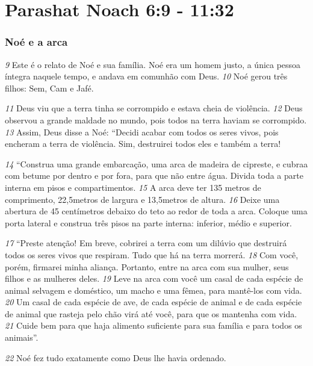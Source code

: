 \section*{Parashat Noach 6:9 - 11:32}
\subsubsection*{Noé e a arca}
\textit{\tiny 9}
 Este é o relato de Noé e sua família. Noé era um homem justo, a única pessoa íntegra naquele tempo, e andava em comunhão com Deus. 
\textit{\tiny 10}
Noé gerou três filhos: Sem, Cam e Jafé.



\bigskip
\textit{\tiny 11}
 Deus viu que a terra tinha se corrompido e estava cheia de violência. 
\textit{\tiny 12}
 Deus observou a grande maldade no mundo, pois todos na terra haviam se corrompido. 
\textit{\tiny 13}
 Assim, Deus disse a Noé: “Decidi acabar com todos os seres vivos, pois encheram a terra de violência. Sim, destruirei todos eles e também a terra!



\bigskip
\textit{\tiny 14}
 “Construa uma grande embarcação, uma arca de madeira de cipreste, e cubraa com betume por dentro e por fora, para que não entre água. Divida toda a parte interna em pisos e compartimentos. 
\textit{\tiny 15}
 A arca deve ter 135 metros de comprimento, 
22,5metros de largura e 
13,5metros de altura. 
\textit{\tiny 16}
 Deixe uma abertura de 45 centímetros debaixo do teto ao redor de toda a arca. Coloque uma porta lateral e construa três pisos na parte interna: inferior, médio e superior.



\bigskip
\textit{\tiny 17}
 “Preste atenção! Em breve, cobrirei a terra com um dilúvio que destruirá todos os seres vivos que respiram. Tudo que há na terra morrerá. 
\textit{\tiny 18}
 Com você, porém, firmarei minha aliança. Portanto, entre na arca com sua mulher, seus filhos e as mulheres deles. 
\textit{\tiny 19}
 Leve na arca com você um casal de cada espécie de animal selvagem e doméstico, um macho e uma fêmea, para mantê-los com vida. 
\textit{\tiny 20}
 Um casal de cada espécie de ave, de cada espécie de animal e de cada espécie de animal que rasteja pelo chão virá até você, para que os mantenha com vida. 
\textit{\tiny 21}
 Cuide bem para que haja alimento suficiente para sua família e para todos os animais”.



\bigskip
\textit{\tiny 22}
 Noé fez tudo exatamente como Deus lhe havia ordenado.

